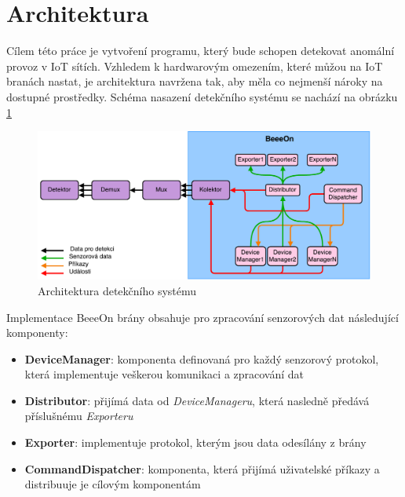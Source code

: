  \section{Architektura}
 Cílem této práce je vytvoření programu, který bude schopen detekovat anomální provoz v IoT sítích. 
 Vzhledem k hardwarovým omezením, které můžou na IoT branách nastat, je architektura navržena tak, aby
 měla co nejmenší nároky na dostupné prostředky. Schéma nasazení detekčního systému se nachází
 na obrázku \ref{obr.deploy-arch}
 
 \begin{figure}[ht]
   \begin{center}
   \includegraphics[scale=0.41]{pictures/deploy-arch}
   \caption{Architektura detekčního systému}
   \label{obr.deploy-arch}
   \end{center}
   \end{figure}
 
 Implementace BeeeOn brány obsahuje pro zpracování senzorových dat následující komponenty:
 \begin{itemize}
  \item \textbf{DeviceManager}:
    komponenta definovaná pro každý senzorový protokol, která implementuje veškerou komunikaci
    a zpracování dat
    
  \item \textbf{Distributor}:  
  přijímá data od \textit{DeviceManageru}, která nasledně předává příslušnému \textit{Exporteru}
  
  \item \textbf{Exporter}:
  implementuje protokol, kterým jsou data odesílány z brány
  
  \item \textbf{CommandDispatcher}:  
  komponenta, která přijímá uživatelské příkazy a distribuuje je cílovým komponentám
  
 \end{itemize}
 
